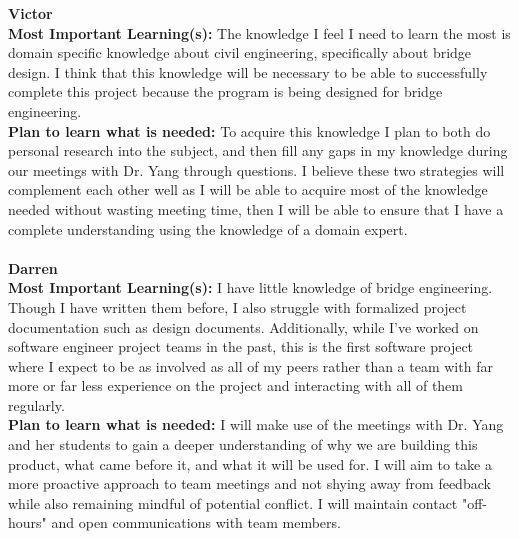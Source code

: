 \documentclass[12pt]{article}
\begin{document}
\noindent\textbf{Victor}\\
\textbf{Most Important Learning(s):} The knowledge I feel I need to learn the most is domain specific knowledge about civil engineering, specifically about bridge design. 
I think that this knowledge will be necessary to be able to successfully complete this project because the program is being designed for bridge engineering.\\
\textbf{Plan to learn what is needed:} To acquire this knowledge I plan to both do personal research into the subject, and then fill any gaps in my knowledge during 
our meetings with Dr. Yang through questions. I believe these two strategies will complement each other well as I will be able to acquire most of the knowledge needed 
without wasting meeting time, then I will be able to ensure that I have a complete understanding using the knowledge of a domain expert.\\\\

\noindent\textbf{Darren}\\
\textbf{Most Important Learning(s):} I have little knowledge of bridge engineering. Though I have written them before, I also struggle with formalized project documentation 
such as design documents. Additionally, while I've worked on software engineer project teams in the past, this is the first software project where I expect to be as involved as all of my 
peers rather than a team with far more or far less experience on the project and interacting with all of them regularly.\\
\textbf{Plan to learn what is needed:} I will make use of the meetings with Dr. Yang and her students to gain a deeper understanding of why we are building this product, 
what came before it, and what it will be used for. I will aim to take a more proactive approach to team meetings and not shying away from feedback while also remaining mindful of 
potential conflict. I will maintain contact "off-hours" and open communications with team members.\\\\
\end{document}
